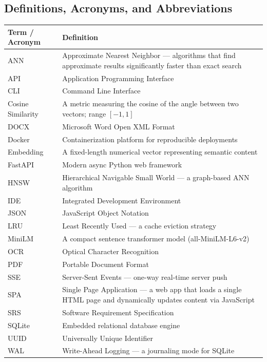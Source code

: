 \documentclass[11pt,a4paper]{article}
\begin{document}
\subsection{Definitions, Acronyms, and Abbreviations}

\begin{longtable}{@{}p{3.5cm}p{10cm}@{}}
\toprule
\textbf{Term / Acronym} & \textbf{Definition} \\
\midrule
\endhead
ANN & Approximate Nearest Neighbor --- algorithms that find approximate results significantly faster than exact search \\
API & Application Programming Interface \\
CLI & Command Line Interface \\
Cosine Similarity & A metric measuring the cosine of the angle between two vectors; range $[-1, 1]$ \\
DOCX & Microsoft Word Open XML Format \\
Docker & Containerization platform for reproducible deployments \\
Embedding & A fixed-length numerical vector representing semantic content \\
FastAPI & Modern async Python web framework \\
HNSW & Hierarchical Navigable Small World --- a graph-based ANN algorithm \\
IDE & Integrated Development Environment \\
JSON & JavaScript Object Notation \\
LRU & Least Recently Used --- a cache eviction strategy \\
MiniLM & A compact sentence transformer model (all-MiniLM-L6-v2) \\
OCR & Optical Character Recognition \\
PDF & Portable Document Format \\
SSE & Server-Sent Events --- one-way real-time server push \\
SPA & Single Page Application --- a web app that loads a single HTML page and dynamically updates content via JavaScript \\
SRS & Software Requirement Specification \\
SQLite & Embedded relational database engine \\
UUID & Universally Unique Identifier \\
WAL & Write-Ahead Logging --- a journaling mode for SQLite \\
\bottomrule
\end{longtable}
\end{document}
